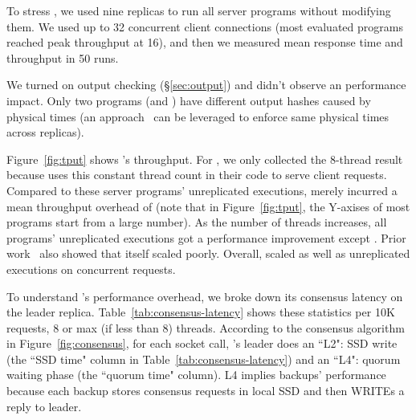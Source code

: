 To stress \xxx, we used nine replicas to run all \nprog server 
programs without modifying them. We used up to 32 concurrent 
client connections (most evaluated programs reached peak throughput at 
16), and then we measured mean response time and throughput in 50 runs.



We turned on output checking (\S\ref{sec:output}) and didn't 
observe an performance impact. Only two programs (\mysql and \openldap) 
have different output hashes caused by physical times 
(an approach~\cite{paxos:practical} can be leveraged to enforce same physical 
times across replicas).

Figure~\ref{fig:tput} shows \xxx's throughput. For \calvin, we only collected 
the 8-thread result because \calvin uses this constant thread count in their 
code to serve client requests. Compared to these server programs' 
unreplicated executions, \xxx merely incurred a mean throughput overhead of 
\tputoverhead (note that in Figure~\ref{fig:tput}, the Y-axises of most 
programs start from a large number). As the number of threads increases, all 
programs' unreplicated executions got a performance improvement except 
\memcached. Prior work~\cite{rex:eurosys14} also showed that
\memcached itself scaled poorly. Overall, \xxx scaled as well as unreplicated 
executions on concurrent requests.


To understand \xxx's performance overhead, we broke down its consensus latency 
on the leader replica. Table~\ref{tab:consensus-latency} shows these statistics 
per 10K requests, 8 or max (if less than 8) threads. According to the consensus 
algorithm in Figure~\ref{fig:consensus}, for each socket call, \xxx's leader 
does an ``L2": SSD write (the ``SSD time" column in 
Table~\ref{tab:consensus-latency}) and an ``L4": quorum waiting phase (the 
``quorum time" column). L4 implies backups' performance because each backup 
stores consensus requests in local SSD and then WRITEs a reply to leader.

